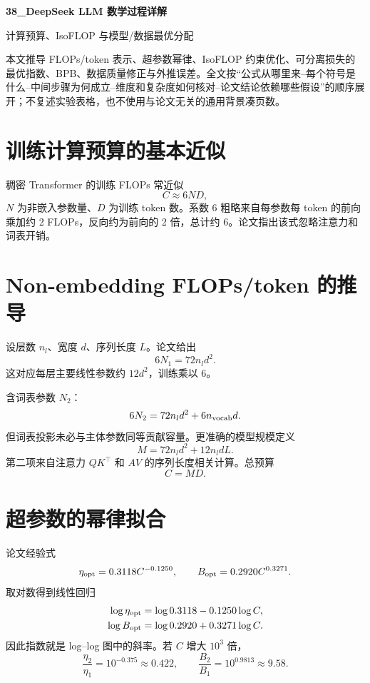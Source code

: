 \documentclass[UTF8,12pt,a4paper,fontset=none]{ctexart}
\numberwithin{equation}{section}
\begin{document}
\begin{center}
{\LARGE\bfseries 38\_DeepSeek LLM 数学过程详解}\par
\vspace{0.35em}
{\large 计算预算、IsoFLOP 与模型/数据最优分配}
\end{center}
\vspace{0.45em}
\begin{keybox}[本文只处理真正需要推导的部分]
本文推导 FLOPs/token 表示、超参数幂律、IsoFLOP 约束优化、可分离损失的最优指数、BPB、数据质量修正与外推误差。全文按“公式从哪里来--每个符号是什么--中间步骤为何成立--维度和复杂度如何核对--论文结论依赖哪些假设”的顺序展开；不复述实验表格，也不使用与论文无关的通用背景凑页数。
\end{keybox}
\tableofcontents
\newpage

\section{训练计算预算的基本近似}
稠密 Transformer 的训练 FLOPs 常近似
\begin{equation}
 C\approx6ND,
\end{equation}
$N$ 为非嵌入参数量、$D$ 为训练 token 数。系数 6 粗略来自每参数每 token 的前向乘加约 2 FLOPs，反向约为前向的 2 倍，总计约 6。论文指出该式忽略注意力和词表开销。

\section{Non-embedding FLOPs/token 的推导}
设层数 $n_l$、宽度 $d$、序列长度 $L$。论文给出
\begin{equation}
 6N_1=72n_ld^2.
\end{equation}
这对应每层主要线性参数约 $12d^2$，训练乘以 6。

含词表参数 $N_2$：
\begin{equation}
 6N_2=72n_ld^2+6n_{\rm vocab}d.
\end{equation}
但词表投影未必与主体参数同等贡献容量。更准确的模型规模定义
\begin{equation}
 \boxed{M=72n_ld^2+12n_ldL}.
\end{equation}
第二项来自注意力 $QK^\top$ 和 $AV$ 的序列长度相关计算。总预算
\begin{equation}
 \boxed{C=MD}.
\end{equation}

\section{超参数的幂律拟合}
论文经验式
\begin{equation}
 \eta_{\rm opt}=0.3118C^{-0.1250},
 \qquad B_{\rm opt}=0.2920C^{0.3271}.
\end{equation}
取对数得到线性回归
\begin{align}
 \log\eta_{\rm opt}&=\log0.3118-0.1250\log C,\\
 \log B_{\rm opt}&=\log0.2920+0.3271\log C.
\end{align}
因此指数就是 log--log 图中的斜率。若 $C$ 增大 $10^3$ 倍，
\begin{equation}
 \frac{\eta_2}{\eta_1}=10^{-0.375}\approx0.422,
 \qquad \frac{B_2}{B_1}=10^{0.9813}\approx9.58.
\end{equation}
\end{document}
